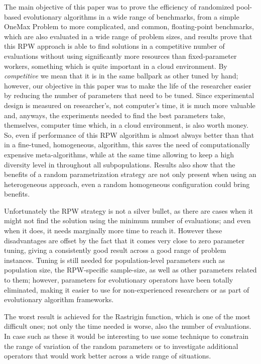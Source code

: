 \documentclass[conference]{IEEEtran}
\begin{document}
The main objective of this paper was to prove the efficiency of
randomized pool-based evolutionary algorithms in a wide range of
benchmarks, from a simple OneMax Problem to more complicated, and
common, floating-point benchmarks, which are also evaluated in a wide
range of problem sizes, and results prove that this RPW approach is
able to find solutions in a competitive number of evaluations without
using significantly more resources than fixed-parameter workers,
something which is quite important in a cloud environment. By {\em
competitive} we mean that it is in the same ballpark as other tuned by
hand; however, our objective in this paper was to make the life of the
researcher easier by reducing the number of parameters that need to be
tuned. Since experimental design is measured on researcher's, not
computer's time, it is much more valuable and, anyways, the
experiments needed to find the best parameters take, themselves,
computer time which, in a cloud environment, is also worth money. So,
even if performance of this RPW algorithm is almost always better than
that in a fine-tuned, homogeneous, algorithm, this saves the need of
computationally expensive meta-algorithms, while at the same time
allowing to keep a high diversity level in throughout all
subpopulations.  Results also show that the benefits of a random
parametrization strategy are not only present when using an
heterogeneous approach, even a random homogeneous configuration could
bring benefits.

Unfortunately the RPW strategy is not a silver bullet, as there are cases
when it might not find the solution using the minimum number of
evaluations; and even when it does, it needs marginally more time to
reach it. However these disadvantages are
offset by the fact that it comes very close to zero parameter tuning,
giving a consistently good result across a good range of problem
instances. Tuning is still needed for population-level parameters such
as population size, the RPW-specific sample-size, as well as other
parameters related to them; however, parameters for evolutionary
operators have been totally eliminated, making it easier to use for
non-experienced researchers or as part of evolutionary algorithm
frameworks.

The worst result is achieved for the Rastrigin function, which
is one of the most difficult ones; not only the time needed is worse,
also the number of evaluations. In case such as these it would be
interesting to use some technique to constrain the range of variation
of the random parameters or to investigate additional operators that
would work better across a wide range of situations.
\end{document}
